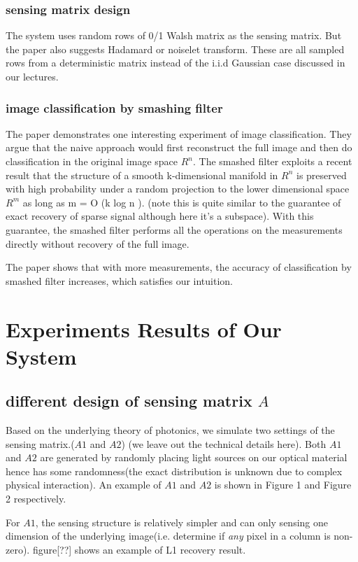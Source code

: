 \documentclass{article} %
\begin{document}
\subsubsection{sensing matrix design}
The system uses random rows of 0/1 Walsh matrix as the sensing matrix. But the paper also suggests Hadamard or noiselet transform. These are all sampled rows from a deterministic matrix instead of the i.i.d Gaussian case discussed in our lectures.
\subsubsection{image classification by smashing filter}
The paper demonstrates one interesting experiment of image classification. They argue that the naive approach would first reconstruct the full image and then do classification in the original image space $R^n$. The smashed filter exploits a recent result that the structure of a smooth k-dimensional manifold in $R^n$ is preserved with high probability under a random projection to the lower dimensional space $R^m$ as long as m = O (k log n ). (note this is quite similar to the guarantee of exact recovery of sparse signal although here it's a subspace). With this guarantee, the smashed filter performs all the operations on the measurements directly without recovery of the full image.

The paper shows that with more measurements, the accuracy of classification by smashed filter increases, which satisfies our intuition.

\section{Experiments Results of Our System}
\subsection{different design of sensing matrix $A$}
Based on the underlying theory of photonics, we simulate two settings of the sensing matrix.($A1$ and $A2$) (we leave out the technical details here). 
Both $A1$ and $A2$ are generated by randomly placing light sources on our optical material hence has some randomness(the exact distribution is unknown due to complex physical interaction). An example of $A1$ and $A2$ is shown in Figure 1 and Figure 2 respectively.

 For $A1$, the sensing structure is relatively simpler and can only sensing one dimension of the underlying image(i.e. determine if \textit{any} pixel in a column is non-zero). figure[??] shows an example of L1 recovery result.
 
\end{document}
